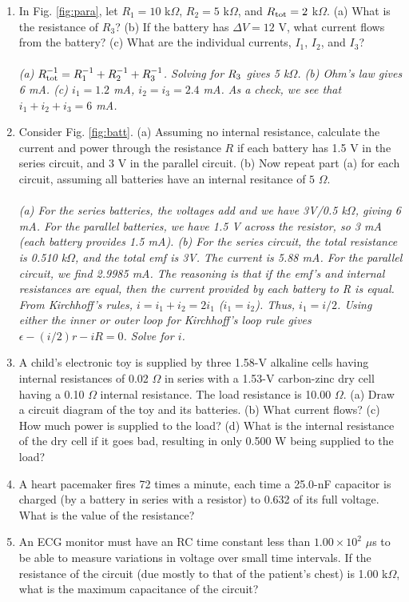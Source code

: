\documentclass[12pt,twocolumn]{article}
\begin{document}
\begin{enumerate}
\item In Fig. \ref{fig:para}, let $R_1 = 10$ k$\Omega$, $R_2 = 5$ k$\Omega$, and $R_{\rm tot} = 2$ k$\Omega$.  (a) What is the resistance of $R_3$? (b) If the battery has $\Delta V = 12$ V, what current flows from the battery? (c) What are the individual currents, $I_1$, $I_2$, and $I_3$? \\ \\
\textit{(a) $R_{\rm tot}^{-1} = R_{\rm 1}^{-1} + R_{\rm 2}^{-1} + R_{\rm 3}^{-1}$.  Solving for $R_{\rm 3}$ gives 5 k$\Omega$. (b) Ohm's law gives 6 mA. (c) $i_1 = 1.2$ mA, $i_2 = i_3 = 2.4$ mA.  As a check, we see that $i_1 + i_2 + i_3 = 6$ mA.}
\item Consider Fig. \ref{fig:batt}. (a) Assuming no internal resistance, calculate the current and power through the resistance $R$ if each battery has 1.5 V in the series circuit, and 3 V in the parallel circuit. (b) Now repeat part (a) for each circuit, assuming all batteries have an internal resitance of $5$ $\Omega$. \\ \\
\textit{(a) For the series batteries, the voltages add and we have 3V/0.5 k$\Omega$, giving 6 mA.  For the parallel batteries, we have 1.5 V across the resistor, so 3 mA (each battery provides 1.5 mA). (b) For the series circuit, the total resistance is 0.510 k$\Omega$, and the total emf is 3V.  The current is 5.88 mA.  For the parallel circuit, we find 2.9985 mA.  The reasoning is that if the emf's and internal resistances are equal, then the current provided by each battery to R is equal.  From Kirchhoff's rules, $i = i_1 + i_2 = 2 i_1$ ($i_1 = i_2$).  Thus, $i_1 = i/2$.  Using either the inner or outer loop for Kirchhoff's loop rule gives $\epsilon - (i/2)r - iR = 0$.  Solve for $i$.}
\item A child's electronic toy is supplied by three 1.58-V alkaline cells having internal resistances of 0.02 $\Omega$ in series with a 1.53-V carbon-zinc dry cell having a 0.10 $\Omega$ internal resistance. The load resistance is 10.00 $\Omega$. (a) Draw a circuit diagram of the toy and its batteries. (b) What current flows? (c) How much power is supplied to the load? (d) What is the internal resistance of the dry cell if it goes bad, resulting in only 0.500 W being supplied to the load? \\ \vspace{4cm}
\item A heart pacemaker fires 72 times a minute, each time a 25.0-nF capacitor is charged (by a battery in series with a resistor) to 0.632 of its full voltage. What is the value of the resistance? \\ \vspace{5cm}
\item An ECG monitor must have an RC time constant less than $1.00 \times 10^2$ $\mu$s to be able to measure variations in voltage over small time intervals. If the resistance of the circuit (due mostly to that of the patient’s chest) is 1.00 k$\Omega$, what is the maximum capacitance of the circuit? \\
\end{enumerate}
\end{document}
